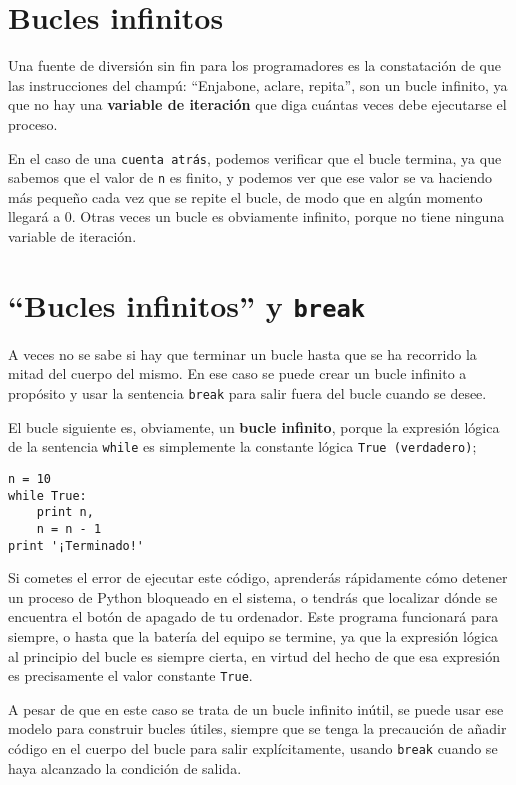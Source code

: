 \section{Bucles infinitos}

Una fuente de diversión sin fin para
los programadores es la constatación de que las instrucciones del champú:
``Enjabone, aclare, repita'', son un bucle infinito, ya que
no hay una {\bf variable de iteración} que diga cuántas veces
debe ejecutarse el proceso.


En el caso de una {\tt cuenta atrás}, podemos verificar que el bucle
termina, ya que sabemos que el valor de {\tt n} es finito, y podemos
ver que ese valor se va haciendo más pequeño cada vez que
se repite el bucle, de modo que en algún momento llegará a 0. Otras veces
un bucle es obviamente infinito, porque no tiene ninguna variable de iteración.

\section{``Bucles infinitos'' y {\tt break}}

A veces no se sabe si hay que terminar un bucle hasta que se ha
recorrido la mitad del cuerpo del mismo. En ese caso se puede crear un bucle infinito a propósito
y usar la sentencia {\tt break} para salir fuera del bucle cuando se desee.

El bucle siguiente es, obviamente, un {\bf bucle infinito}, porque la
expresión lógica de la sentencia
{\tt while} es simplemente la constante lógica {\tt True (verdadero)};

\beforeverb
\begin{verbatim}
n = 10
while True:
    print n, 
    n = n - 1
print '¡Terminado!'
\end{verbatim}
\afterverb
%
Si cometes el error de ejecutar este código, aprenderás rápidamente cómo
detener un proceso de Python bloqueado en el sistema, o tendrás que localizar dónde
se encuentra el botón de apagado de tu ordenador.
Este programa funcionará para siempre,
o hasta que la batería del equipo se termine,
ya que la expresión lógica al principio del bucle
es siempre cierta, en virtud del hecho de que esa expresión es
precisamente el valor constante {\tt True}.
 
A pesar de que en este caso se trata de un bucle infinito inútil, se puede usar ese modelo
para construir bucles útiles, siempre que se tenga la precaución de añadir código
en el cuerpo del bucle para salir explícitamente, usando {\tt break}
cuando se haya alcanzado la condición de salida.


